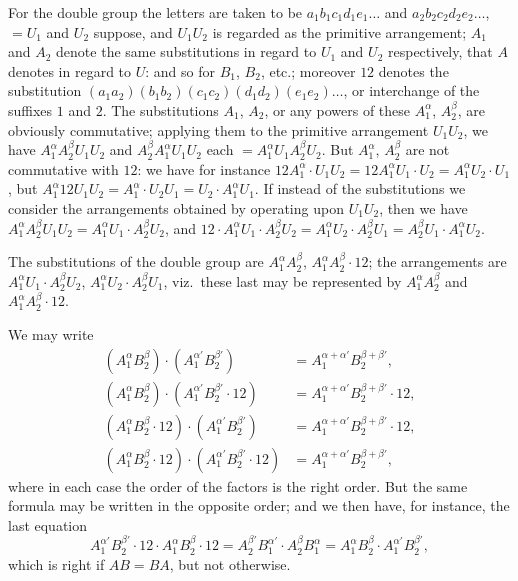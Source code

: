 \documentclass[11pt,a4paper]{article}
\theoremstyle{plain}
\theoremstyle{definition}
\begin{document}
For the double group the letters are taken to be $a_1 b_1 c_1 d_1 e_1 \ldots$ and $a_2 b_2 c_2 d_2 e_2 \ldots$, $= U_1$ and $U_2$ suppose, and $U_1 U_2$ is regarded as the primitive arrangement; $A_1$ and $A_2$ denote the same substitutions in regard to $U_1$ and $U_2$ respectively, that $A$ denotes in regard to $U$: and so for $B_1$, $B_2$, etc.; moreover $12$ denotes the substitution $(a_1 a_2)(b_1 b_2)(c_1 c_2)(d_1 d_2)(e_1 e_2)\ldots$, or interchange of the suffixes $1$ and $2$. The substitutions $A_1$, $A_2$, or any powers of these $A_1^\alpha$, $A_2^\beta$, are obviously commutative; applying them to the primitive arrangement $U_1 U_2$, we have $A_1^\alpha A_2^\beta U_1 U_2$ and $A_2^\beta A_1^\alpha U_1 U_2$ each $= A_1^\alpha U_1 A_2^\beta U_2$. But $A_1^\alpha$, $A_2^\beta$ are not commutative with $12$: we have for instance $12 A_1^\alpha \cdot U_1 U_2 = 12 A_1^\alpha U_1 \cdot U_2 = A_1^\alpha U_2 \cdot U_1$, but $A_1^\alpha 12 U_1 U_2 = A_1^\alpha \cdot U_2 U_1 = U_2 \cdot A_1^\alpha U_1$. If instead of the substitutions we consider the arrangements obtained by operating upon $U_1 U_2$, then we have $A_1^\alpha A_2^\beta U_1 U_2 = A_1^\alpha U_1 \cdot A_2^\beta U_2$, and $12 \cdot A_1^\alpha U_1 \cdot A_2^\beta U_2 = A_1^\alpha U_2 \cdot A_2^\beta U_1 = A_2^\beta U_1 \cdot A_1^\alpha U_2$.

The substitutions of the double group are $A_1^\alpha A_2^\beta$, $A_1^\alpha A_2^\beta \cdot 12$; the arrangements are $A_1^\alpha U_1 \cdot A_2^\beta U_2$, $A_1^\alpha U_2 \cdot A_2^\beta U_1$, viz.~these last may be represented by $A_1^\alpha A_2^\beta$ and $A_1^\alpha A_2^\beta \cdot 12$.

We may write
\begin{align*}
(A_1^\alpha B_2^\beta) \cdot (A_1^{\alpha'} B_2^{\beta'}) &= A_1^{\alpha + \alpha'} B_2^{\beta + \beta'}, \\
(A_1^\alpha B_2^\beta) \cdot (A_1^{\alpha'} B_2^{\beta'} \cdot 12) &= A_1^{\alpha + \alpha'} B_2^{\beta + \beta'} \cdot 12, \\
(A_1^\alpha B_2^\beta \cdot 12) \cdot (A_1^{\alpha'} B_2^{\beta'}) &= A_1^{\alpha + \alpha'} B_2^{\beta + \beta'} \cdot 12, \\
(A_1^\alpha B_2^\beta \cdot 12) \cdot (A_1^{\alpha'} B_2^{\beta'} \cdot 12) &= A_1^{\alpha + \alpha'} B_2^{\beta + \beta'},
\end{align*}
where in each case the order of the factors is the right order. But the same formula may be written in the opposite order; and we then have, for instance, the last equation
\[
A_1^{\alpha'} B_2^{\beta'} \cdot 12 \cdot A_1^\alpha B_2^\beta \cdot 12 = A_2^{\beta'} B_1^{\alpha'} \cdot A_2^\beta B_1^\alpha = A_1^\alpha B_2^\beta \cdot A_1^{\alpha'} B_2^{\beta'},
\]
which is right if $AB = BA$, but not otherwise.
\end{document}
